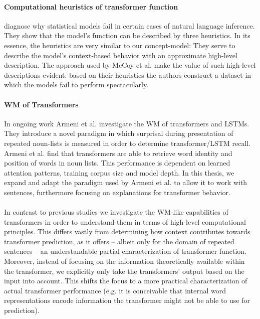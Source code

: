 \paragraph{Computational heuristics of transformer function} \cite{mccoy_right_2019} diagnose why statistical models fail in certain cases of natural language inference. They show that the model's function can be described by three heuristics.
In its essence, the heuristics are very similar to our concept-model:
They serve to describe the model's context-based behavior with an approximate high-level description.
The approach used by McCoy et al. make the value of such high-level descriptions evident: based on their heuristics the authors construct a dataset in which the models fail to perform spectacularly.

\paragraph{WM of Transformers} In ongoing work Armeni et al. investigate the WM of transformers and LSTMs.
They introduce a novel paradigm in which surprisal during presentation of repeated noun-lists is measured in order to determine transformer/LSTM recall.
Armeni et al. find that transformers are able to retrieve word identity and position of words in noun lists.
This performance is dependent on learned attention patterns, training corpus size and model depth.
In this thesis, we expand and adapt the paradigm used by Armeni et al. to allow it to work with sentences, furthermore focusing on explanations for transformer behavior.

\paragraph{} In contrast to previous studies we investigate the WM-like capabilities of transformers in order to understand them in terms of high-level computational principles.
This differs vastly from determining how context contributes towards transformer prediction, as it offers -- albeit only for the domain of repeated sentences -- an understandable partial characterization of transformer function.
Moreover, instead of focusing on the information theoretically available within the transformer, we explicitly only take the transformers' output based on the input into account. This shifts the focus to a more practical characterization of actual transformer performance (e.g. it is conceivable that internal word representations encode information the transformer might not be able to use for prediction).

\newpage
